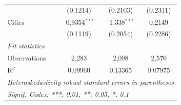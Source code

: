 \begin{tabular}{lccc}
                       & (0.1214)        & (0.2103)        & (0.2311)\\   
   Cities              & -0.9354$^{***}$ & -1.338$^{***}$  & 0.2149\\   
                       & (0.1119)        & (0.2054)        & (0.2286)\\   
   \midrule
   \emph{Fit statistics}\\
   Observations        & 2,283           & 2,098           & 2,570\\  
   R$^2$               & 0.09960         & 0.13365         & 0.07975\\  
   \midrule \midrule
   \multicolumn{4}{l}{\emph{Heteroskedasticity-robust standard-errors in parentheses}}\\
   \multicolumn{4}{l}{\emph{Signif. Codes: ***: 0.01, **: 0.05, *: 0.1}}\\
\end{tabular}
\par\endgroup


